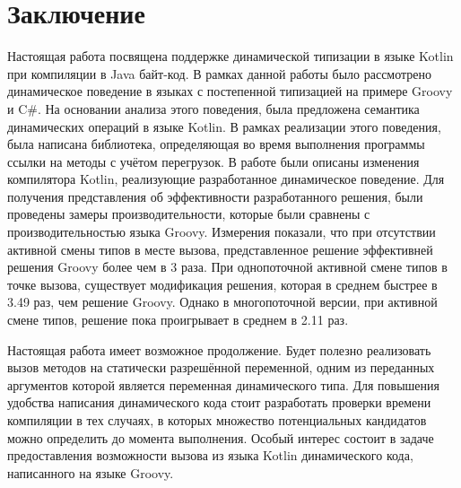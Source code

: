 \vfill
\clearpage
\section*{Заключение}


Настоящая работа посвящена поддержке динамической типизации в языке Kotlin при компиляции в Java байт-код.
В рамках данной работы было рассмотрено динамическое поведение в языках с постепенной типизацией на примере Groovy и C\#. На основании анализа этого поведения, была предложена семантика динамических операций в языке Kotlin. В рамках реализации этого поведения, была написана библиотека, определяющая во время выполнения программы ссылки на методы с учётом перегрузок. В работе были описаны изменения компилятора Kotlin, реализующие разработанное динамическое поведение. Для получения представления об эффективности разработанного решения, были проведены замеры производительности, которые были сравнены с производительностью языка Groovy.
Измерения показали, что при отсутствии активной смены типов в месте вызова, представленное решение эффективней решения Groovy более чем в 3 раза. При однопоточной активной смене типов в точке вызова, существует модификация решения, которая в среднем быстрее в 3.49 раз, чем решение Groovy. Однако в многопоточной версии, при активной смене типов, решение пока проигрывает в среднем в 2.11 раз.


Настоящая работа имеет возможное продолжение. Будет полезно реализовать вызов методов на статически разрешённой переменной, одним из переданных аргументов которой является переменная динамического типа. Для повышения удобства написания динамического кода стоит разработать проверки времени компиляции в тех случаях, в которых множество потенциальных кандидатов можно определить до момента выполнения. Особый интерес состоит в задаче предоставления возможности вызова из языка Kotlin динамического кода, написанного на языке Groovy.

